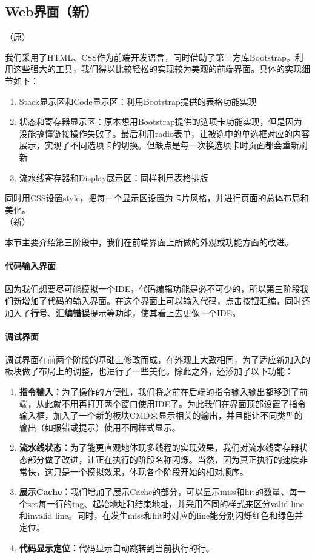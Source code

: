 \documentclass[12pt]{article} %
\begin{document}
\begin{sloppypar}
\subsection{Web界面（新）}

（原）

我们采用了HTML、CSS作为前端开发语言，同时借助了第三方库Bootstrap。利用这些强大的工具，我们得以比较轻松的实现较为美观的前端界面。具体的实现细节如下：

\begin{enumerate}
\item Stack显示区和Code显示区：利用Bootstrap提供的表格功能实现
\item 状态和寄存器显示区：原本想用Bootstrap提供的选项卡功能实现，但是因为没能搞懂链接操作失败了。最后利用radio表单，让被选中的单选框对应的内容展示，实现了不同选项卡的切换。但缺点是每一次换选项卡时页面都会重新刷新
\item 流水线寄存器和Display展示区：同样利用表格排版
\end{enumerate}

同时用CSS设置style，把每一个显示区设置为卡片风格，并进行页面的总体布局和美化。\\

（新）

本节主要介绍第三阶段中，我们在前端界面上所做的外观或功能方面的改进。
\paragraph{代码输入界面} 

因为我们想要尽可能模拟一个IDE，代码编辑功能是必不可少的，所以第三阶段我们新增加了代码的输入界面。在这个界面上可以输入代码，点击按钮汇编，同时还加入了{\bf 行号}、{\bf 汇编错误}提示等功能，使其看上去更像一个IDE。

\paragraph{调试界面}

调试界面在前两个阶段的基础上修改而成，在外观上大致相同，为了适应新加入的板块做了布局上的调整，也进行了一些美化。除此之外，还添加了以下功能：
\begin{enumerate}
\item {\bf 指令输入：}为了操作的方便性，我们将之前在后端的指令输入输出都移到了前端，从此就不用再打开两个窗口使用IDE了。为此我们在界面顶部设置了指令输入框，加入了一个新的板块CMD来显示相关的输出，并且能让不同类型的输出（如报错或提示）使用不同样式显示。
\item {\bf 流水线状态：}为了能更直观地体现多线程的实现效果，我们对流水线寄存器状态部分做了改进，让正在执行的阶段名称闪烁。当然，因为真正执行的速度非常快，这只是一个模拟效果，体现各个阶段开始的相对顺序。
\item {\bf 展示Cache：}我们增加了展示Cache的部分，可以显示miss和hit的数量、每一个set每一行的tag、起始地址和结束地址，并采用不同的样式来区分valid line和invalid line。同时，在发生miss和hit时对应的line能分别闪烁红色和绿色并定位。
\item {\bf 代码显示定位：}代码显示自动跳转到当前执行的行。
\end{enumerate}



\end{sloppypar}
\end{document}
